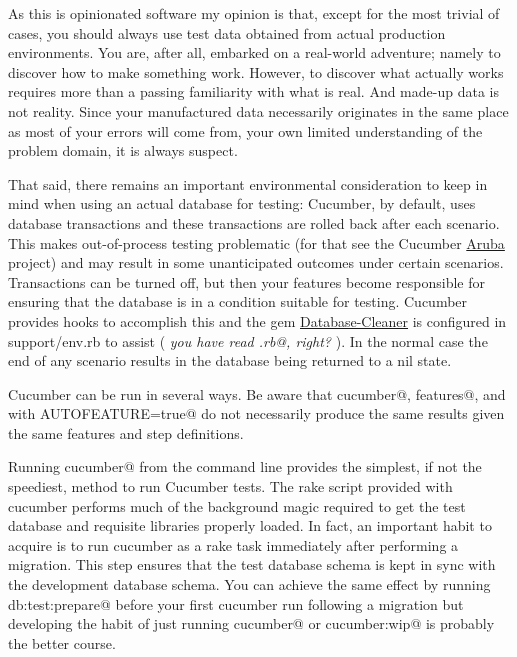 As this is opinionated software my opinion is that, except for the most trivial of cases, you should always use test data obtained from actual production environments.  You are, after all, embarked on a real-world adventure; namely to discover how to make something work.  However, to discover what actually works requires more than a passing familiarity with what is real.  And made-up data is not reality.  Since your manufactured data necessarily originates in the same place as most of your errors will come from, your own limited understanding of the problem domain, it is always suspect.

That said, there remains an important environmental consideration to keep in mind when using an actual database for testing: Cucumber, by default, uses database transactions and these transactions are rolled back after each scenario.  This makes out-of-process testing problematic (for that see the Cucumber \href{http://github.com/cucumber/aruba}{Aruba} project)  and may result in some unanticipated outcomes under certain scenarios.  Transactions can be turned off, but then your features become responsible for ensuring that the database is in a condition suitable for testing.  Cucumber provides hooks to accomplish this and the gem \href{http://github.com/bmabey/database_cleaner}{Database-Cleaner} is configured in support/env.rb to assist ( \emph{you have read \verb@env.rb@, right?} ). In the normal case the end of any scenario results in the database being returned to a nil state.

Cucumber can be run in several ways.  Be aware that \verb@rake cucumber@, \verb@cucumber features@, and \verb@autotest@ with \verb@ENV AUTOFEATURE=true@ do not necessarily produce the same results given the same features and step definitions.

Running \verb@rake cucumber@ from the command line provides the simplest, if not the speediest, method to run Cucumber tests. The rake script provided with cucumber performs much of the background magic required to get the test database and requisite libraries properly loaded.  In fact, an important habit to acquire is to run cucumber as a rake task immediately after performing a migration.  This step ensures that the test database schema is kept in sync with the development database schema.  You can achieve the same effect by running \verb@rake db:test:prepare@ before your first cucumber run following a migration but developing the habit of just running \verb@rake cucumber@ or \verb@rake cucumber:wip@ is probably the better course.

